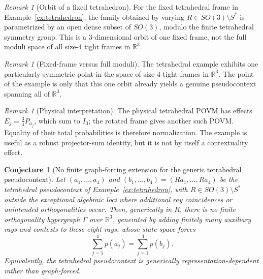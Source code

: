\documentclass[
  twocolumn,
  aps,
  pra,
  floatfix,
  amsmath,amssymb,
  longbibliography
]{revtex4-2}
\newtheorem{conjecture}[theorem]{Conjecture}
\theoremstyle{definition}
\theoremstyle{remark}
\newtheorem{remark}[theorem]{Remark}
\begin{document}
\begin{remark}[Orbit of a fixed tetrahedron]\label{rem:tetrahedron_family}
For the fixed tetrahedral frame in Example~\ref{ex:tetrahedron}, the family
obtained by varying $R\in SO(3)\setminus S^{*}$ is parametrized by an open
dense subset of $SO(3)$, modulo the finite tetrahedral symmetry group.
This is a 3-dimensional orbit of one fixed frame, not the full moduli space
of all size-4 tight frames in $\mathbb{R}^3$.
\end{remark}

\begin{remark}[Fixed-frame versus full moduli]
The tetrahedral example exhibits one particularly symmetric point in the
space of size-4 tight frames in $\mathbb{R}^3$. The point of the example
is only that this one orbit already yields a genuine pseudocontext spanning
all of $\mathbb{R}^3$.
\end{remark}

\begin{remark}[Physical interpretation]
The physical tetrahedral POVM has effects
$E_j=\tfrac34P_{a_j}$, which sum to $I_3$; the rotated frame gives
another such POVM.  Equality of their total probabilities is therefore
normalization.  The example is useful as a robust projector-sum identity,
but it is not by itself a contextuality effect.
\end{remark}

\begin{conjecture}[No finite graph-forcing extension for the generic tetrahedral pseudocontext]
\label{conj:tetrahedron_not_graph_forced}
Let \((a_1,\ldots,a_4)\) and \((b_1,\ldots,b_4)=(Ra_1,\ldots,Ra_4)\) be the tetrahedral pseudocontext of Example~\ref{ex:tetrahedron}, with \(R\in SO(3)\setminus S^\ast\) outside the exceptional algebraic loci where additional ray coincidences or unintended orthogonalities occur. Then, generically in \(R\), there is no finite orthogonality hypergraph \(\Gamma\) over \(\mathbb R^3\), generated by adding finitely many auxiliary rays and contexts to these eight rays, whose state space forces
\[
\sum_{j=1}^4 p(a_j)=\sum_{j=1}^4 p(b_j).
\]
Equivalently, the tetrahedral pseudocontext is generically representation-dependent rather than graph-forced.
\end{conjecture}
\end{document}
